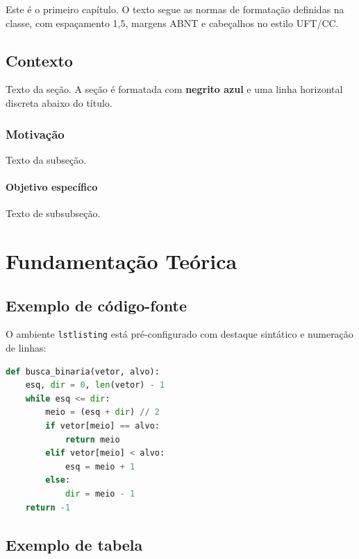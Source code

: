 \documentclass[techreport]{uftreport}
\begin{document}
Este é o primeiro capítulo. O texto segue as normas de formatação
definidas na classe, com espaçamento 1,5, margens ABNT e cabeçalhos
no estilo UFT/CC.

\section{Contexto}

Texto da seção. A seção é formatada com \textbf{negrito azul} e uma
linha horizontal discreta abaixo do título.

\subsection{Motivação}

Texto da subseção.

\subsubsection{Objetivo específico}

Texto de subsubseção.

\chapter{Fundamentação Teórica}

\section{Exemplo de código-fonte}

O ambiente \texttt{lstlisting} está pré-configurado com destaque
sintático e numeração de linhas:

\begin{lstlisting}[language=Python, caption={Busca binária em Python}]
def busca_binaria(vetor, alvo):
    esq, dir = 0, len(vetor) - 1
    while esq <= dir:
        meio = (esq + dir) // 2
        if vetor[meio] == alvo:
            return meio
        elif vetor[meio] < alvo:
            esq = meio + 1
        else:
            dir = meio - 1
    return -1
\end{lstlisting}

\section{Exemplo de tabela}
\end{document}
